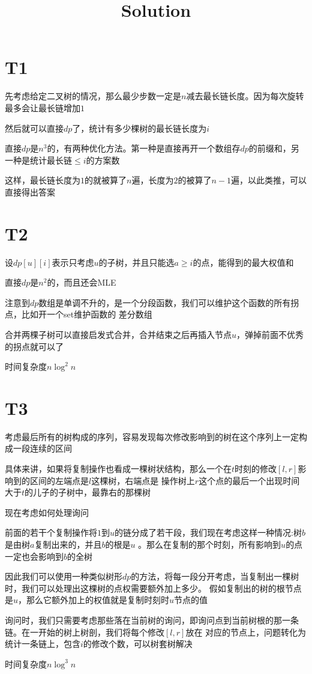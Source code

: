 \documentclass[12pt]{article}
\title{Solution}
\author{}
\date{}
\begin{document}
    \maketitle
    \section{T1}
    先考虑给定二叉树的情况，那么最少步数一定是$n$减去最长链长度。因为每次旋转最多会让最长链增加$1$\par
    然后就可以直接$dp$了，统计有多少棵树的最长链长度为$i$\par
    直接$dp$是$n^3$的，有两种优化方法。第一种是直接再开一个数组存$dp$的前缀和，另一种是统计最长链$\leq i$的方案数\par
    这样，最长链长度为$1$的就被算了$n$遍，长度为$2$的被算了$n-1$遍，以此类推，可以直接得出答案
    \section{T2}
    设$dp[u][i]$表示只考虑$u$的子树，并且只能选$a\geq i$的点，能得到的最大权值和\par
    直接$dp$是$n^2$的，而且还会MLE\par
    注意到$dp$数组是单调不升的，是一个分段函数，我们可以维护这个函数的所有拐点，比如开一个set维护函数的
    差分数组\par
    合并两棵子树可以直接启发式合并，合并结束之后再插入节点$u$，弹掉前面不优秀的拐点就可以了\par
    时间复杂度$n\log^2 n$
    \section{T3}
    考虑最后所有的树构成的序列，容易发现每次修改影响到的树在这个序列上一定构成一段连续的区间\par
    具体来讲，如果将复制操作也看成一棵树状结构，那么一个在$t$时刻的修改$[l,r]$影响到的区间的左端点是$l$这棵树，右端点是
    操作树上$r$这个点的最后一个出现时间大于$t$的儿子的子树中，最靠右的那棵树\par
    现在考虑如何处理询问\par
    前面的若干个复制操作将$1$到$u$的链分成了若干段，我们现在考虑这样一种情况:树$b$是由树$a$复制出来的，并且$b$的根是$u$
    。那么在复制的那个时刻，所有影响到$u$的点一定也会影响到$b$的全树\par
    因此我们可以使用一种类似树形$dp$的方法，将每一段分开考虑，当复制出一棵树时，我们可以处理出这棵树的点权需要额外加上多少。
    假如复制出的树的根节点是$u$，那么它额外加上的权值就是复制时刻时$u$节点的值\par
    询问时，我们只需要考虑那些落在当前树的询问，即询问点到当前树根的那一条链。在一开始的树上树剖，我们将每个修改$[l,r]$放在
    对应的节点上，问题转化为统计一条链上，包含$i$的修改个数，可以树套树解决\par
    时间复杂度$n\log^3 n$
\end{document}
